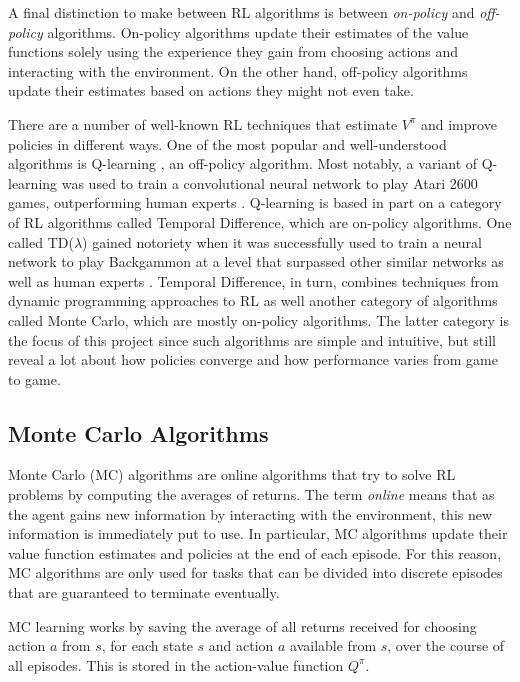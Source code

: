 \documentclass[11pt,a4paper]{report}
\begin{document}
A final distinction to make between RL algorithms is between \emph{on-policy} and \emph{off-policy} algorithms. On-policy algorithms update their estimates of the value functions solely using the experience they gain from choosing actions and interacting with the environment. On the other hand, off-policy algorithms update their estimates based on actions they might not even take.

There are a number of well-known RL techniques that estimate $V^{\pi}$ and improve policies in different ways. One of the most popular and well-understood \cite{challenges-of-rl} algorithms is Q-learning \cite{q-learning}, an off-policy algorithm. Most notably, a variant of Q-learning was used to train a convolutional neural network to play Atari 2600 games, outperforming human experts \cite{atari}. Q-learning is based in part on a category of RL algorithms called Temporal Difference, which are on-policy algorithms. One called TD($\lambda$) gained notoriety when it was successfully used to train a neural network to play Backgammon at a level that surpassed other similar networks as well as human experts \cite{backgammon}. Temporal Difference, in turn, combines techniques from dynamic programming approaches to RL as well another category of algorithms called Monte Carlo, which are mostly on-policy algorithms. The latter category is the focus of this project since such algorithms are simple and intuitive, but still reveal a lot about how policies converge and how performance varies from game to game.


\subsection{Monte Carlo Algorithms}
\label{sec:MonteCarloAlgorithms}

Monte Carlo (MC) algorithms are online algorithms that try to solve RL problems by computing the averages of returns. The term \emph{online} means that as the agent gains new information by interacting with the environment, this new information is immediately put to use. In particular, MC algorithms update their value function estimates and policies at the end of each episode. For this reason, MC algorithms are only used for tasks that can be divided into discrete episodes that are guaranteed to terminate eventually.

MC learning works by saving the average of all returns received for choosing action $a$ from $s$, for each state $s$ and action $a$ available from $s$, over the course of all episodes. This is stored in the action-value function $Q^{\pi}$.
\end{document}
